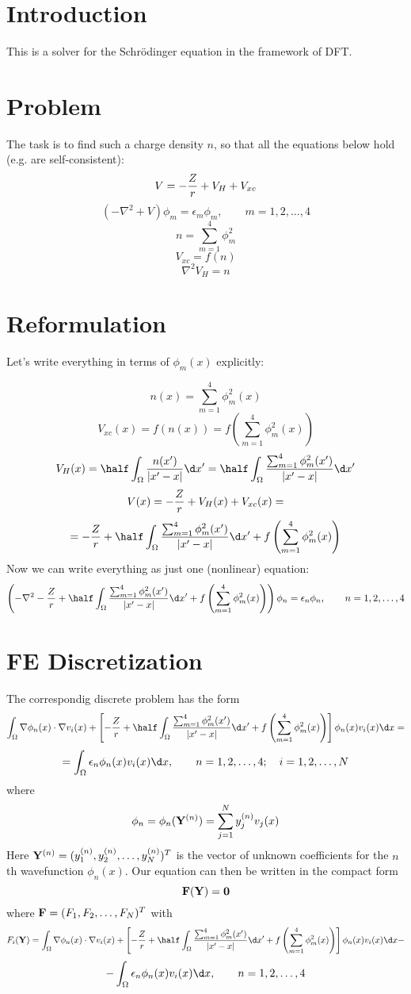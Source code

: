 \documentclass[11pt]{article}
\begin{document}
\section{Introduction}

This is a solver for the Schr\"odinger equation in the framework of DFT.

\section{Problem}

The task is to find such a charge density $n$, so that all the equations below hold (e.g. are
self-consistent):
$$ V = -{Z\over r} + V_H + V_{xc} $$
$$
\left(-\nabla^2+V\right)\phi_m = \epsilon_m\phi_m,\quad\quad m = 1, 2, \dots, 4
$$
$$ n = \sum_{m=1}^4 \phi_m^2 $$
$$ V_{xc} = f(n) $$
$$ \nabla^2 V_H = n $$

\section{Reformulation}

Let's write everything in terms of $\phi_m(x)$ explicitly:

$$n(x) = %
\sum_{m=1}^4 \phi_m^2(x)$$
$$V_{xc}(x) = f(n(x)) = f\left( \sum_{m=1}^4\phi_m^2(x) \right)$$
$$V_H(x) = \half \int_\Omega {n(x')\over|x' - x|}\d x'=
\half \int_\Omega {
\sum_{m=1}^4 \phi_m^2(x')
\over|x' - x|}\d x'
$$
$$V(x) = -{Z\over r} + V_H(x) + V_{xc}(x)=$$
$$
=-{Z\over r}+
\half \int_\Omega {
\sum_{m=1}^4 \phi_m^2(x')
\over|x' - x|}\d x'
+f\left( \sum_{m=1}^4\phi_m^2(x) \right)
$$
Now we can write everything as just one (nonlinear)
equation:
$$
\left(-\nabla^2
-{Z\over r}+
\half \int_\Omega {
\sum_{m=1}^4 \phi_m^2(x')
\over|x' - x|}\d x'
+f\left( \sum_{m=1}^4\phi_m^2(x) \right)
\right)\phi_n = \epsilon_n\phi_n,\quad\quad n = 1, 2, \dots, 4
$$

\section{FE Discretization}

The correspondig discrete problem has the form
$$
\int_\Omega \nabla\phi_n(x)\cdot\nabla v_i(x)+\left[
-{Z\over r}+
\half \int_\Omega {
\sum_{m=1}^4 \phi_m^2(x')
\over|x' - x|}\d x'
+f\left( \sum_{m=1}^4\phi_m^2(x) \right)
\right]
\phi_n(x) v_i(x)  \d x=
$$
$$
=\int_\Omega
\epsilon_n\phi_n(x) v_i(x) \d x,\quad\quad n = 1, 2, \dots, 4;\quad
i = 1, 2, \dots, N
$$
where
$$\phi_n = \phi_n({\bf Y}^{(n)}) = \sum_{j=1}^N y_j^{(n)} v_j(x)$$
Here ${\bf Y}^{(n)} = (y_1^{(n)}, y_2^{(n)}, \dots, y_N^{(n)})^T$ is the vector
of unknown coefficients for the $n$th wavefunction $\phi_n(x)$. Our equation
can then be written in the compact form
$${\bf F}({\bf Y}) = {\bf 0}$$
where ${\bf F} = (F_1, F_2, \dots, F_N)^T$ with
$$F_i({\bf Y}) =
\int_\Omega \nabla\phi_n(x)\cdot\nabla v_i(x)+\left[
-{Z\over r}+
\half \int_\Omega {
\sum_{m=1}^4 \phi_m^2(x')
\over|x' - x|}\d x'
+f\left( \sum_{m=1}^4\phi_m^2(x) \right)
\right]
\phi_n(x) v_i(x)  \d x-
$$
$$
-\int_\Omega
\epsilon_n\phi_n(x) v_i(x) \d x,\quad\quad n = 1, 2, \dots, 4
$$
\end{document}

